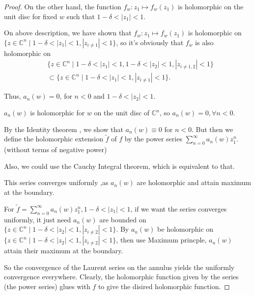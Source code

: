 \begin{proof}
    On the other hand, the function $f_w\colon z_1\mapsto f_w(z_1)$ is holomorphic on the unit disc for fixed $w$ such that $1-\delta<|z_1|<1$. 
    \begin{remark}
        On above description, we have shown that $f_w\colon z_1\mapsto f_w(z_1)$ is holomorphic on $\{z\in\mathbb{C}^n\mid 1-\delta<|z_1|<1,|z_{i\neq 1}|<1\}$, so it's obviously that $f_w$ is also holomorphic on 
        \begin{align*}
        &\{z\in\mathbb{C}^n\mid 1-\delta<|z_1|<1,1-\delta<|z_2|<1,|z_{i\neq 1,2}|<1\}\\
        &\subset \{z\in\mathbb{C}^n\mid 1-\delta<|z_1|<1,|z_{i\neq 1}|<1\}.
        \end{align*}
    \end{remark}
    Thus, $a_n (w)=0$, for $n<0$ and $1-\delta<|z_2|<1$. 
    \begin{remark}
        $a_n(w)$ is holomorphic for $w$ on the unit disc of $\mathbb{C}^n$, so $a_n (w)=0, \forall n<0$. 
    \end{remark}
    By the Identity theorem , we show that $a_n(w)\equiv 0$ for $n<0$. But then we define the holomorphic extension $\widetilde{f}$ of $f$ by the power series $\sum_{n=0}^{\infty}a_n (w)z_1^n$. (without terms of negative power)
    \begin{remark}
        Also, we could use the Cauchy Integral theorem, which is equivalent to that.
    \end{remark}
    This series converges uniformly ,as $a_n (w)$ are holomorphic and attain maximum at the boundary. 
    \begin{remark}
        For $\widetilde{f}=\sum_{n=0}^{\infty}a_n(w)z_1^n, 1-\delta<|z_1|<1$, if we want the series converges uniformly, it just need $a_n(w)$ are bounded on $\{z\in\mathbb{C}^n\mid 1-\delta<|z_2|<1,|z_{i\neq 2}|<1\}$. By $a_n(w)$ be holomorphic on $\{z\in\mathbb{C}^n\mid 1-\delta<|z_2|<1,|z_{i\neq 2}|<1\}$, then use Maximum princple, $a_n(w)$ attain their maximum at the boundary.
        \end{remark}
        So the convergence of the Laurent series on the annulus yields the uniformly convergence everywhere. Clearly, the holomorphic function given by the series (the power series) glues with $f$ to give the disired holomorphic function.
\end{proof}













